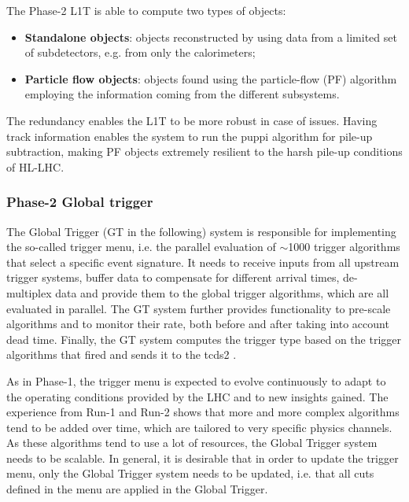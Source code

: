 \documentclass[../../main.tex]{subfiles}
\begin{document}
The Phase-2 L1T is able to compute two types of objects:
\begin{itemize}
    \item \textbf{Standalone objects}: objects reconstructed by using data from a limited set of subdetectors, e.g.
from only the calorimeters;
    \item \textbf{Particle flow objects}: objects found using the particle-flow (PF) algorithm employing the information coming from the different subsystems.
\end{itemize}

The redundancy enables the L1T to be more robust in case of issues. Having track information enables the system to run the \acrfull{puppi} algorithm \cite{PUPPI} for pile-up subtraction, making PF objects extremely resilient to the harsh pile-up conditions of HL-LHC.

\subsubsection{Phase-2 Global trigger}
\label{Phase-2_GT}

The Global Trigger (GT in the following) system is responsible for implementing the so-called trigger menu, i.e. the parallel evaluation of $\sim$1000 trigger algorithms that select a specific event signature. It needs to receive inputs from all upstream trigger systems, buffer data to compensate for different arrival times, de-multiplex data and provide them to the global trigger algorithms, which are all evaluated in parallel. The GT system further provides functionality to pre-scale algorithms and to monitor their rate, both before and after taking into account dead time. Finally, the GT system computes the trigger type based on the trigger algorithms that fired and sends it to the \acrfull{tcds2} \cite{TCDS2}.  

As in Phase-1, the trigger menu is expected to evolve continuously to adapt to the operating conditions provided by the LHC and to new insights gained. The experience from Run-1 and Run-2 shows that more and more complex algorithms tend to be added over time, which are tailored to very specific physics channels. As these algorithms tend to use a lot of resources, the Global Trigger system needs to be scalable. In general, it is desirable that in order to update the trigger menu, only the Global Trigger system needs to be updated, i.e. that all cuts defined in the menu are applied in the Global Trigger.
\end{document}
